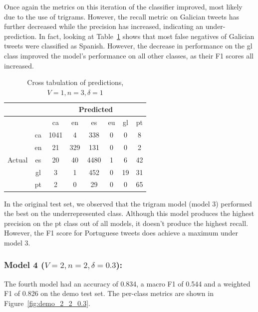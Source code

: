 \documentclass[runningheads]{llncs}
\begin{document}
Once again the metrics on this iteration of the classifier improved, most likely due to the use of trigrams. However, the recall metric on Galician tweets has further decreased while the precision has increased, indicating an under-prediction. In fact, looking at Table~\ref{tab:demo_confusion_1_3_1} shows that most false negatives of Galician tweets were classified as Spanish. However, the decrease in performance on the gl class improved the model's performance on all other classes, as their F1 scores all increased.

\begin{table}
	\centering
	\caption{Cross tabulation of predictions, $V=1, n=3, \delta=1$}
	\label{tab:demo_confusion_1_3_1}
	\begin{tabular}{|c|c|c|c|c|c|c|c|} \hline
	    & & \multicolumn{6}{c|}{Predicted} \\ \hline
		& &    ca &   en &    es &  eu &  gl &  pt \\ \hline
		\multirow{6}{*}{Actual} & ca   &  1041 &    4 &   338 &   0 &   0 &   8 \\
		& en   &    21 &  329 &   131 &   0 &   0 &   2 \\
		& es   &    20 &   40 &  4480 &   1 &   6 &  42 \\
		& gl   &     3 &    1 &   452 &   0 &  19 &  31 \\
		& pt   &     2 &    0 &    29 &   0 &   0 &  65 \\ \hline
	\end{tabular}
\end{table}

In the original test set, we observed that the trigram model (model 3) performed the best on the underrepresented class. Although this model produces the highest precision on the pt class out of all models, it doesn't produce the highest recall. However, the F1 score for Portuguese tweets does achieve a maximum under model 3.

\subsubsection{Model 4 ($V=2, n=2, \delta=0.3$): }
The fourth model had an accuracy of 0.834, a macro F1 of 0.544 and a weighted F1 of 0.826 on the demo test set. The per-class metrics are shown in Figure~\ref{fig:demo_2_2_0.3}.
\end{document}
